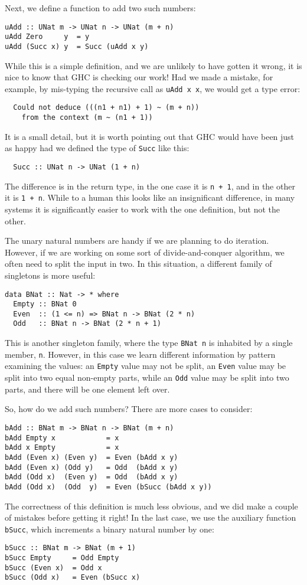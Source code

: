 \documentclass{sigplanconf}
\begin{document}
Next, we define a function to add two such numbers:
\begin{Verbatim}
uAdd :: UNat m -> UNat n -> UNat (m + n)
uAdd Zero     y  = y
uAdd (Succ x) y  = Succ (uAdd x y)
\end{Verbatim}
While this is a simple definition, and we are unlikely
to have gotten it wrong, it is nice to know that GHC
is checking our work!  Had we made a mistake, for
example, by mis-typing the recursive call as \Verb"uAdd x x",
we would get a type error:
\begin{Verbatim}
  Could not deduce (((n1 + n1) + 1) ~ (m + n))
    from the context (m ~ (n1 + 1))
\end{Verbatim}
It is a small detail, but it is worth pointing out that
GHC would have been just as happy had we defined the type
of \Verb"Succ" like this:
\begin{Verbatim}
  Succ :: UNat n -> UNat (1 + n)
\end{Verbatim}
The difference is in the return type, in the one case it is
\Verb"n + 1", and in the other it is \Verb"1 + n".  While
to a human this looks like an insignificant difference,
in many systems it is significantly easier to work
with the one definition, but not the other.

The unary natural numbers are handy if we are planning to
do iteration.  However, if we are working on some sort of
divide-and-conquer algorithm, we often need to split the
input in two.  In this situation, a different family of
singletons is more useful:
\begin{Verbatim}
data BNat :: Nat -> * where
  Empty :: BNat 0
  Even  :: (1 <= n) => BNat n -> BNat (2 * n)
  Odd   :: BNat n -> BNat (2 * n + 1)
\end{Verbatim}
This is another singleton family, where the type \Verb"BNat n"
is inhabited by a single member, \Verb"n".  However, in this
case we learn different information by pattern examining
the values:  an \Verb"Empty" value may not be split,
an \Verb"Even" value may be split into two equal non-empty
parts, while an \Verb"Odd" value may be split into two parts,
and there will be one element left over.

So, how do we add such numbers?  There are more cases to
consider:
\begin{Verbatim}
bAdd :: BNat m -> BNat n -> BNat (m + n)
bAdd Empty x            = x
bAdd x Empty            = x
bAdd (Even x) (Even y)  = Even (bAdd x y)
bAdd (Even x) (Odd y)   = Odd  (bAdd x y)
bAdd (Odd x)  (Even y)  = Odd  (bAdd x y)
bAdd (Odd x)  (Odd  y)  = Even (bSucc (bAdd x y))
\end{Verbatim}
The correctness of this definition is much less obvious,
and we did make a couple of mistakes before getting it
right!  In the last case, we use the auxiliary function
\Verb"bSucc", which increments a binary natural number
by one:
\begin{Verbatim}
bSucc :: BNat m -> BNat (m + 1)
bSucc Empty     = Odd Empty
bSucc (Even x)  = Odd x
bSucc (Odd x)   = Even (bSucc x)
\end{Verbatim}
\end{document}
